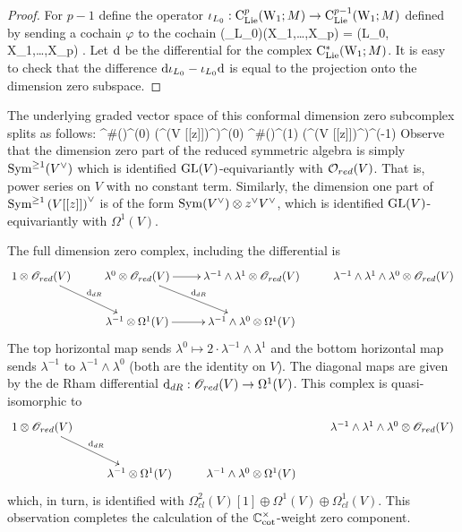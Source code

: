 \begin{proof} For $p-1$ define the operator $\iota_{L_0} : {\rm C}_{{\rm Lie}}^{p}({\rm W}_1 ; M) \to {\rm C}_{{\rm Lie}}^{p-1}({\rm W}_1 ; M)$ defined by sending a cochain $\varphi$ to the cochain
\ben
(\iota_{L_0}\varphi)(X_1,\ldots,X_p) = \varphi(L_0, X_1,\ldots,X_p) .
\een 
Let ${\rm d}$ be the differential for the complex ${\rm C}_{{\rm Lie}}^*({\rm W}_1 ; M)$. It is easy to check that the difference ${\rm d} \iota_{L_0} - \iota_{L_0} {\rm d}$ is equal to the projection onto the dimension zero subspace. 
\end{proof}

The underlying graded vector space of this conformal dimension zero subcomplex splits as follows:
\ben
\clie^{\#}(\wone)^{(0)} \tensor \left(\Sym^{}\left(V [[z]]\right)^\vee \right)^{(0)} \oplus \clie^{\#}(\wone)^{(1)} \tensor \left(\Sym^{}\left(V [[z]]\right)^\vee\right)^{(-1)}
\een
Observe that the dimension zero part of the reduced symmetric algebra is simply ${\rm Sym}^{\geq 1}(V^\vee)$ which is identified ${\rm GL}(V)$-equivariantly with $\mathcal O_{red}(V)$. 
That is, power series on $V$ with no constant term. 
Similarly, the dimension one part of ${\rm Sym}^{\geq 1}\left(V[[z]]\right)^\vee$ is of the form ${\rm Sym}(V^\vee) \otimes z^\vee V^\vee$, which is identified ${\rm GL}(V)$-equivariantly with $\Omega^1(V)$. 

The full dimension zero complex, including the differential is
\[
\xymatrix{
1 \otimes \sO_{red}(V) \ar[rd]^{\d_{dR}} & \lambda^0 \otimes \sO_{red}(V) \ar[r] \ar[rd]^{\d_{dR}} & \lambda^{-1} \wedge \lambda^1 \otimes \sO_{red}(V) & \lambda^{-1} \wedge \lambda^1 \wedge \lambda^0 \otimes \sO_{red}(V) \\
 & \lambda^{-1} \otimes \Omega^1(V) \ar[r] & \lambda^{-1} \wedge \lambda^0 \otimes\Omega^1(V) &
}
\]
The top horizontal map sends $\lambda^0 \mapsto 2 \cdot \lambda^{-1} \wedge \lambda^1$ and the bottom horizontal map sends $\lambda^{-1}$ to $\lambda^{-1} \wedge \lambda^0$ (both are the identity on $V$). 
The diagonal maps are given by the de Rham differential ${\rm d}_{dR} : \mathscr O_{red}(V) \to \Omega^1(V)$. 
This complex is quasi-isomorphic to 
\[
\xymatrix{
1 \otimes \sO_{red}(V) \ar[rd]^{\d_{dR}} & & & \lambda^{-1} \wedge \lambda^1 \wedge \lambda^0 \otimes \sO_{red}(V) \\
 & \lambda^{-1} \otimes \Omega^1(V) & \lambda^{-1} \wedge \lambda^0 \otimes\Omega^1(V) &
}
\]
which, in turn, is identified with $\Omega^{2}_{cl}(V)[1] \oplus \Omega^1(V) \oplus \Omega^1_{cl}(V)$. This observation completes the calculation of the $\mathbb C^\times_{\rm cot}$-weight zero component. 

